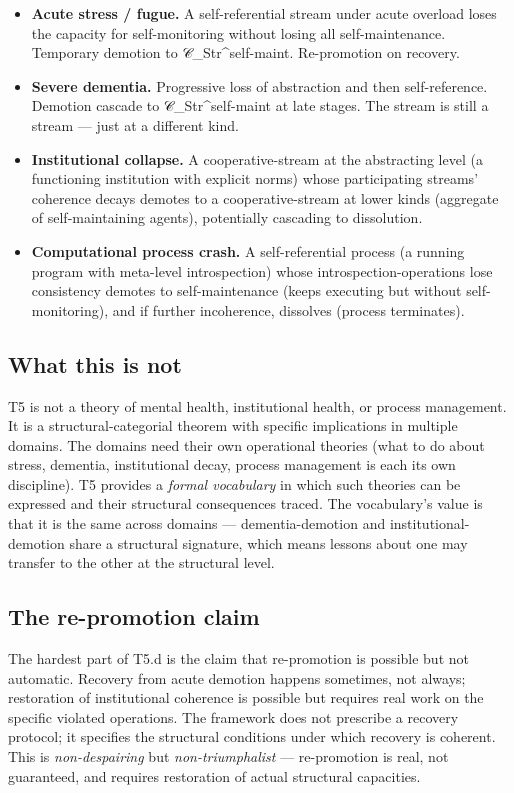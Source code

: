 \documentclass[11pt, openany]{book}
\begin{document}
\begin{itemize}
\item \textbf{Acute stress / fugue.} A self-referential stream under acute overload loses the capacity for self-monitoring without losing all self-maintenance. Temporary demotion to 𝒞\_\allowbreak{}Str\textasciicircum{}self-maint. Re-promotion on recovery.
\item \textbf{Severe dementia.} Progressive loss of abstraction and then self-reference. Demotion cascade to 𝒞\_\allowbreak{}Str\textasciicircum{}self-maint at late stages. The stream is still a stream --- just at a different kind.
\item \textbf{Institutional collapse.} A cooperative-stream at the abstracting level (a functioning institution with explicit norms) whose participating streams' coherence decays demotes to a cooperative-stream at lower kinds (aggregate of self-maintaining agents), potentially cascading to dissolution.
\item \textbf{Computational process crash.} A self-referential process (a running program with meta-level introspection) whose introspection-operations lose consistency demotes to self-maintenance (keeps executing but without self-monitoring), and if further incoherence, dissolves (process terminates).
\end{itemize}

\subsection{What this is not}

T5 is not a theory of mental health, institutional health, or process management. It is a structural-categorial theorem with specific implications in multiple domains. The domains need their own operational theories (what to do about stress, dementia, institutional decay, process management is each its own discipline). T5 provides a \textit{formal vocabulary} in which such theories can be expressed and their structural consequences traced. The vocabulary's value is that it is the same across domains --- dementia-demotion and institutional-demotion share a structural signature, which means lessons about one may transfer to the other at the structural level.

\subsection{The re-promotion claim}

The hardest part of T5.d is the claim that re-promotion is possible but not automatic. Recovery from acute demotion happens sometimes, not always; restoration of institutional coherence is possible but requires real work on the specific violated operations. The framework does not prescribe a recovery protocol; it specifies the structural conditions under which recovery is coherent. This is \textit{non-despairing} but \textit{non-triumphalist} --- re-promotion is real, not guaranteed, and requires restoration of actual structural capacities.
\end{document}
